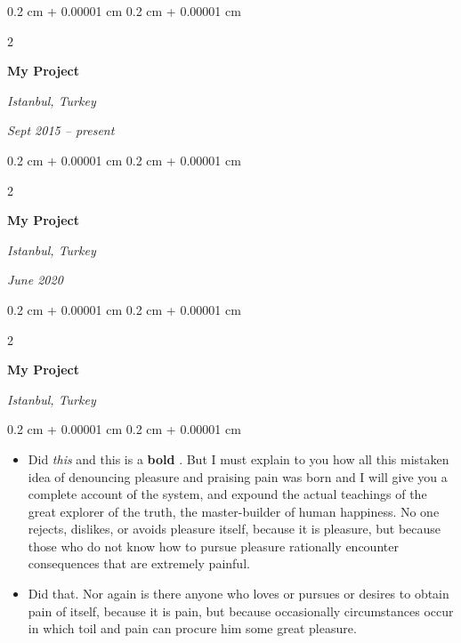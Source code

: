 \documentclass[10pt, letterpaper]{article}
\newenvironment{highlights}{
    \begin{itemize}[
        topsep=0.10 cm,
        parsep=0.10 cm,
        partopsep=0pt,
        itemsep=0pt,
        leftmargin=0.4 cm + 10pt
    ]
}{
    \end{itemize}
} %
\newenvironment{onecolentry}{
    \begin{adjustwidth}{
        0.2 cm + 0.00001 cm
    }{
        0.2 cm + 0.00001 cm
    }
}{
    \end{adjustwidth}
} %
\newenvironment{twocolentry}[2][]{
    \onecolentry
    \def\secondColumn{#2}
    \setcolumnwidth{\fill, 4.5 cm}
    \begin{paracol}{2}
}{
    \switchcolumn \raggedleft \secondColumn
    \end{paracol}
    \endonecolentry
} %
\let\hrefWithoutArrow\href
\renewcommand{\href}[2]{\hrefWithoutArrow{#1}{\ifthenelse{\equal{#2}{}}{ }{#2 }\raisebox{.15ex}{\footnotesize \faExternalLink*}}}
\begin{document}
        \vspace{0.2 cm}

        \begin{twocolentry}{
        \textit{Istanbul, Turkey}    
            
        \textit{Sept 2015 – present}}
            \textbf{My Project}
        \end{twocolentry}



        \vspace{0.2 cm}

        \begin{twocolentry}{
        \textit{Istanbul, Turkey}    
            
        \textit{June 2020}}
            \textbf{My Project}
        \end{twocolentry}



        \vspace{0.2 cm}

        \begin{twocolentry}{
        \textit{Istanbul, Turkey}    
            
        }
            \textbf{My Project}
        \end{twocolentry}

        \vspace{0.10 cm}
        \begin{onecolentry}
            \begin{highlights}
                \item Did \textit{this} and this is a \textbf{bold} \href{https://example.com}{link}. But I must explain to you how all this mistaken idea of denouncing pleasure and praising pain was born and I will give you a complete account of the system, and expound the actual teachings of the great explorer of the truth, the master-builder of human happiness. No one rejects, dislikes, or avoids pleasure itself, because it is pleasure, but because those who do not know how to pursue pleasure rationally encounter consequences that are extremely painful.
                \item Did that. Nor again is there anyone who loves or pursues or desires to obtain pain of itself, because it is pain, but because occasionally circumstances occur in which toil and pain can procure him some great pleasure.
            \end{highlights}
        \end{onecolentry}
\end{document}
